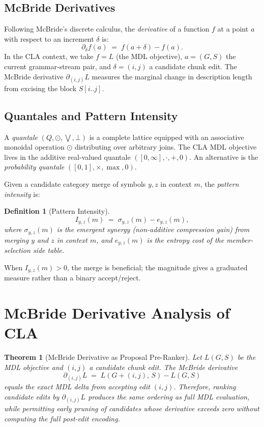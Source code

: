 \documentclass[11pt]{article}
\newtheorem{theorem}{Theorem}
\newtheorem{definition}{Definition}
\begin{document}
\subsection{McBride Derivatives}

Following McBride's discrete calculus, the \emph{derivative} of a function $f$ at a point $a$ with respect to an increment $\delta$ is:
\[
\partial_\delta f(a) \;=\; f(a + \delta) - f(a).
\]
In the CLA context, we take $f = L$ (the MDL objective), $a = (G, S)$ the current grammar-stream pair, and $\delta = (i,j)$ a candidate chunk edit. The McBride derivative $\partial_{(i,j)} L$ measures the marginal change in description length from excising the block $S[i..j]$.

\subsection{Quantales and Pattern Intensity}

A \emph{quantale} $(Q, \odot, \bigvee, \bot)$ is a complete lattice equipped with an associative monoidal operation $\odot$ distributing over arbitrary joins. The CLA MDL objective lives in the additive real-valued quantale $([0,\infty], \cdot, +, 0)$. An alternative is the \emph{probability quantale} $([0,1], \times, \max, 0)$.

Given a candidate category merge of symbols $y, z$ in context $m$, the \emph{pattern intensity} is:

\begin{definition}[Pattern Intensity]
\[
I_{y,z}(m) \;=\; \sigma_{y,z}(m) - e_{y,z}(m),
\]
where $\sigma_{y,z}(m)$ is the emergent synergy (non-additive compression gain) from merging $y$ and $z$ in context $m$, and $e_{y,z}(m)$ is the entropy cost of the member-selection side table.
\end{definition}

When $I_{y,z}(m) > 0$, the merge is beneficial; the magnitude gives a graduated measure rather than a binary accept/reject.

\section{McBride Derivative Analysis of CLA}

\begin{theorem}[McBride Derivative as Proposal Pre-Ranker]
\label{thm:mcbride-prerank}
Let $L(G, S)$ be the MDL objective and $(i, j)$ a candidate chunk edit. The McBride derivative
\[
\partial_{(i,j)} L \;=\; L(G + (i,j),\, S) - L(G, S)
\]
equals the exact MDL delta from accepting edit $(i,j)$. Therefore, ranking candidate edits by $\partial_{(i,j)} L$ produces the same ordering as full MDL evaluation, while permitting early pruning of candidates whose derivative exceeds zero without computing the full post-edit encoding.
\end{theorem}
\end{document}
